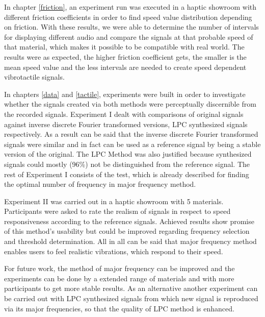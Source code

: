 In chapter \ref{friction}, an experiment run was executed in a haptic showroom with different friction coefficients in order to find speed value distribution depending on friction. With these results, we were able to determine the number of intervals for displaying different audio and compare the signals at that probable speed of that material, which makes it possible to be compatible with real world. The results were as expected, the higher friction coefficient gets, the smaller is the mean speed value and the less intervals are needed to create speed dependent vibrotactile signals.

In chapters \ref{data} and \ref{tactile}, experiments were built in order to investigate whether the signals created via both methods were perceptually discernible from the recorded signals. Experiment I dealt with comparisons of original signals against inverse discrete Fourier transformed versions, LPC synthesized signals respectively. As a result can be said that the inverse discrete Fourier transformed signals were similar and in fact can be used as a reference signal by being a stable version of the original. The LPC Method was also justified because synthesized signals could mostly (96\%) not be distinguished from the reference signal. The rest of Experiment I consists of the test, which is already described for finding the optimal number of frequency in major frequency method. 

Experiment II was carried out in a haptic showroom with 5 materials. Participants were asked to rate the realism of signals in respect to speed responsiveness according to the reference signals. Achieved results show promise of this method's usability but could be improved regarding frequency selection and threshold determination. All in all can be said that major frequency method enables users to feel realistic vibrations, which respond to their speed.

For future work, the method of major frequency can be improved and the experiments can be done by a extended range of materials and with more participants to get more stable results. As an alternative another  experiment can be carried out with LPC synthesized signals from which new signal is reproduced via its major frequencies, so that the quality of LPC method is enhanced.  







